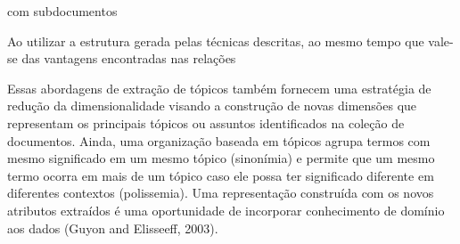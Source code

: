 com subdocumentos 

Ao utilizar a estrutura gerada pelas técnicas descritas, 
ao mesmo tempo que vale-se das vantagens encontradas nas relações




















Essas abordagens de extração de tópicos também fornecem uma estratégia de redução da dimensionalidade visando a construção de novas dimensões que representam os principais tópicos ou assuntos identificados na coleção de documentos. Ainda, uma organização baseada em tópicos agrupa termos com mesmo significado em um mesmo tópico (sinonímia) e permite que um mesmo termo ocorra em mais de um tópico caso ele possa ter significado diferente em diferentes contextos (polissemia). Uma representação construída com os novos atributos extraídos é uma oportunidade de incorporar conhecimento de domínio aos dados (Guyon and Elisseeff, 2003).


